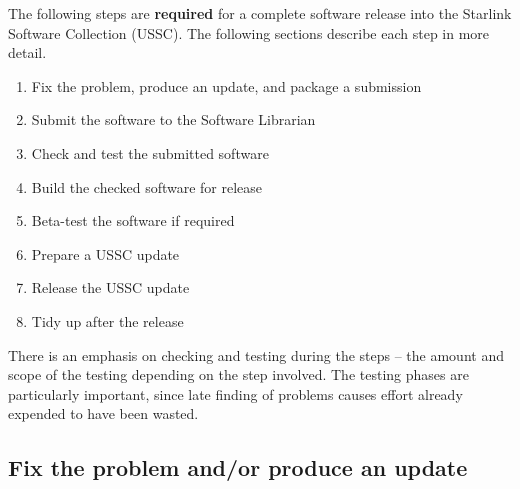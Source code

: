 \documentclass[twoside,11pt]{article}
\newcommand{\xlabel}[1]{}
\begin{document}
The following steps are {\bf{required}} for a complete software release
into the Starlink Software Collection (USSC).  The following sections
describe each step in more detail.

\begin{enumerate}

\item Fix the problem, produce an update, and package a submission

\item Submit the software to the Software Librarian

\item Check and test the submitted software

\item Build the checked software for release

\item Beta-test the software if required

\item Prepare a USSC update

\item Release the USSC update

\item Tidy up after the release
\end{enumerate}

There is an emphasis on checking and testing during the steps -- the
amount and scope of the testing depending on the step involved.  The
testing phases are particularly important, since late finding of
problems causes effort already expended to have been wasted.

\subsection{\label{fix_the_problem}\xlabel{fix_the_problem}Fix the problem and/or produce an update}
\end{document}
